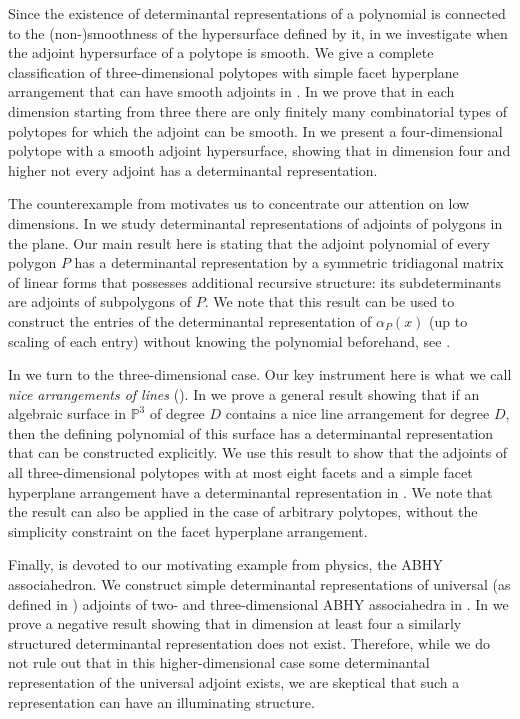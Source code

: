 \documentclass[a4paper,10pt]{amsart}
\theoremstyle{definition}
\theoremstyle{plain}
\begin{document}
Since the existence of determinantal representations of a polynomial is connected to the (non-)smoothness of the hypersurface defined by it, in  we investigate when the adjoint hypersurface of a polytope is smooth. We give a complete classification of three-dimensional polytopes with simple facet hyperplane arrangement that can have smooth adjoints in . In  we prove that in each dimension starting from three there are only finitely many combinatorial types of polytopes for which the adjoint can be smooth. In  we present  a four-dimensional polytope with a smooth adjoint hypersurface, showing that in dimension four and higher not every adjoint has a determinantal representation.

The counterexample from  motivates us to concentrate our attention on low dimensions. In  we study determinantal representations of adjoints of polygons in the plane. Our main result here is  stating that the adjoint polynomial of every polygon $P$ has a determinantal representation by a symmetric tridiagonal matrix of linear forms that possesses additional recursive structure: its subdeterminants are adjoints of subpolygons of $P$. We note that this result can be used to construct the entries of the determinantal representation of $\alpha_P(x)$ (up to scaling of each entry) without knowing the polynomial beforehand, see .

In  we turn to the three-dimensional case. Our key instrument here is what we call \emph{nice arrangements of lines} (). In  we prove a general result showing that if an algebraic surface in $\mathbb{P}^3$ of degree $D$ contains a nice line arrangement for degree $D$, then the defining polynomial of this surface has a determinantal representation that can be constructed explicitly. We use this result to show that the adjoints of all three-dimensional polytopes with at most eight facets and a simple facet hyperplane arrangement have a determinantal representation in . We note that the result can also be applied in the case of arbitrary polytopes, without the simplicity constraint on the facet hyperplane arrangement.  

Finally,  is devoted to our motivating example from physics, the ABHY associahedron. We construct simple determinantal representations of universal (as defined in \cite{telen2025toric}) adjoints of two- and three-dimensional ABHY associahedra in . In  we prove a negative result showing that in dimension at least four a similarly structured determinantal representation does not exist. Therefore, while we do not rule out that in this higher-dimensional case some determinantal representation of the universal adjoint exists, we are skeptical that such a representation can have an illuminating structure. 
\end{document}
